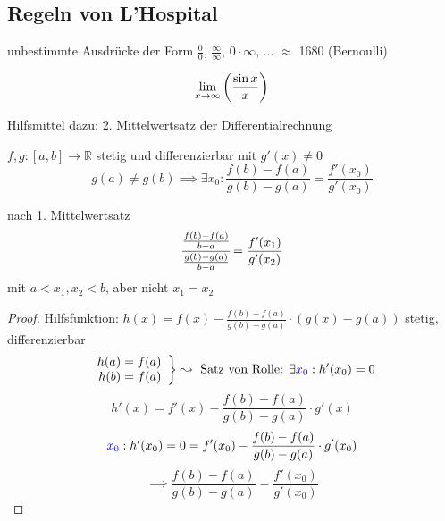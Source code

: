 
\subsection{Regeln von L'Hospital}

unbestimmte Ausdrücke der Form $\frac 0 0$, $\frac \infty \infty$, $0 \cdot \infty$, $\ldots$ $\approx$ 1680 (Bernoulli)
\begin{example}\[ \liminfty[x]{\frac{\sin x} x} \]\end{example}

\noindent Hilfsmittel dazu: 2. Mittelwertsatz der Differentialrechnung
\begin{theorem}
  $f,g: \left[a,b\right] \to \mathbb R$ stetig und differenzierbar mit $g'(x) \neq 0$
  \[ g(a) \neq g(b) \implies \exists x_0: \frac{f(b)-f(a)}{g(b)-g(a)}=\frac{f'(x_0)}{g'(x_0)}  \]
\end{theorem}
\begin{note}
  nach 1. Mittelwertsatz
  \begin{equation*} \cfrac{\frac{f(b)-f(a)}{b-a}}{\frac{g(b)-g(a)}{b-a}} = \frac{f'(x_1)}{g'(x_2)} \end{equation*}
  mit $a < x_1, x_2 < b$, aber nicht $x_1 = x_2$
\end{note}
\begin{proof}
  Hilfsfunktion: $h(x) = f(x) - \frac{f(b)-f(a)}{g(b)-g(a)} \cdot (g(x)-g(a))$ stetig, differenzierbar
  \[
    \left.\begin{array}{r}h(a) = f(a)\\h(b)=f(a)\end{array}\right\} \leadsto \text{ Satz von Rolle: } \exists \textcolor{blue}{x_0}: h'(x_0) = 0
  \]
  \[ h'(x) = f'(x) - \frac{f(b)-f(a)}{g(b)-g(a)} \cdot g'(x) \]
  \[ \textcolor{blue}{x_0}: h'(x_0) = 0 = f'(x_0) - \frac{f(b)-f(a)}{g(b)-g(a)} \cdot g'(x_0) \]
  \[ \implies \frac{f(b)-f(a)}{g(b)-g(a)} = \frac{f'(x_0)}{g'(x_0)} \]
\end{proof}


